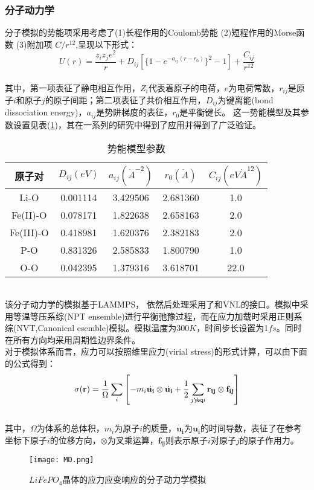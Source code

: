 \subsubsection*{分子动力学}
分子模拟的势能项采用考虑了(1)长程作用的Coulomb势能 (2)短程作用的Morse函数 (3)附加项 $C/r^{12}$,呈现以下形式\cite{Alfonso2006A}：
\begin{equation}
\label{eq:MD}
U(r) = \frac{z_i z_j e^2}{r} +D_{ij} \left[\{1-e^{-a_{ij}(r-r_0)}\}^2 -1 \right] + \frac{C_{ij}}{r^{12}}
\end{equation}
\\
其中，第一项表征了静电相互作用，$Z_i$代表着原子的电荷，$e$为电荷常数，$r_{ij}$是原子$i$和原子$j$的原子间距；第二项表征了共价相互作用，$D_{ij}$为键离能(bond dissociation energy)，$a_{ij}$是势阱梯度的表征，$r_0$是平衡键长。 这一势能模型及其参数设置见表(\ref{tab:md})，其在一系列的研究中得到了应用并得到了广泛验证。
\begin{table}
	\centering
	\caption{势能模型参数}
    \label{tab:md}
    \begin{tabular}{ | c | c | c | c| c|}
    \hline
    \hline
    原子对 & $D_{ij}(eV)$ & $a_{ij}(\dot{A}^{-2})$ & $r_0(\dot{A})$ & $C_{ij} (eV \dot{A}^{12})$ \\ \hline \hline
    Li-O & 0.001114 & 3.429506 &2.681360 & 1.0 \\
    Fe(II)-O & 0.078171 & 1.822638 & 2.658163 & 2.0 \\
    Fe(III)-O & 0.418981 & 1.620376 & 2.382183 & 2.0 \\
    P-O & 0.831326 & 2.585833 & 1.800790&1.0\\
    O-O & 0.042395 & 1.379316 & 3.618701 & 22.0\\
    \hline
    \hline
    \end{tabular}
\end{table}
\\
\indent 该分子动力学的模拟基于LAMMPS\cite{Plimpton1995Fast}， 依然后处理采用了和VNL的接口。模拟中采用等温等压系综(NPT ensemble)进行平衡弛豫过程，而在应力加载时采用正则系综(NVT,Canonical esemble)模拟。模拟温度为300$K$，时间步长设置为1$fs$。同时在所有方向均采用周期性边界条件。
\\
\indent 对于模拟体系而言，应力可以按照维里应力(virial stress)的形式计算，可以由下面的公式得到：
\begin{equation}
\sigma(\mathbf{r}) = \frac{1}{\Omega} \sum_i \left[ -m_i \dot{\mathbf{u_i}} \otimes \dot{\mathbf{u_i}} + \frac{1}{2} \sum_{j \not\eq i} \mathbf{r_{ij}} \otimes \mathbf{f_{ij}} \right]
\end{equation}
\\
\indent 其中，$\Omega$为体系的总体积，$m_i$为原子$i$的质量，$\dot{\mathbf{u_i}}$为$\mathbf{u_i}$的时间导数，表征了在参考坐标下原子$i$的位移方向，$\otimes$为叉乘运算，$\mathbf{f_{ij}}$则表示原子$i$对原子$j$的原子作用力。
\begin{figure}
	\centering   
	\texttt{[image: MD.png]}
	\caption{$LiFePO_4$晶体的应力应变响应的分子动力学模拟} 
	\label{fig:md}
\end{figure}
